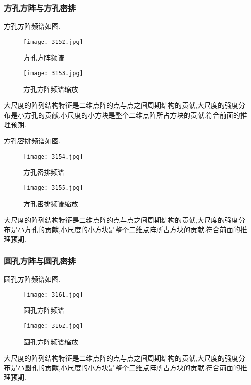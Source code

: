 \documentclass[10pt]{ctexart}
\begin{document}
\subsubsection{方孔方阵与方孔密排}
方孔方阵频谱如图.
\begin{figure}[H]
\begin{minipage}[t]{0.5\linewidth}
\centering
\texttt{[image: 3152.jpg]}
\caption{方孔方阵频谱}
\end{minipage}
\hfill
\begin{minipage}[t]{0.5\linewidth}
\centering
\texttt{[image: 3153.jpg]}
\caption{方孔方阵频谱缩放}
\end{minipage}
\end{figure}
大尺度的阵列结构特征是二维点阵的点与点之间周期结构的贡献,大尺度的强度分布是小方孔的贡献,小尺度的小方块是整个二维点阵所占方块的贡献.符合前面的推理预期.

方孔密排频谱如图.
\begin{figure}[H]
\begin{minipage}[t]{0.5\linewidth}
\centering
\texttt{[image: 3154.jpg]}
\caption{方孔密排频谱}
\end{minipage}
\hfill
\begin{minipage}[t]{0.5\linewidth}
\centering
\texttt{[image: 3155.jpg]}
\caption{方孔密排频谱缩放}
\end{minipage}
\end{figure}
大尺度的阵列结构特征是二维点阵的点与点之间周期结构的贡献,大尺度的强度分布是小方孔的贡献,小尺度的小方块是整个二维点阵所占方块的贡献.符合前面的推理预期.
\subsubsection{圆孔方阵与圆孔密排}
圆孔方阵频谱如图.
\begin{figure}[H]
\begin{minipage}[t]{0.5\linewidth}
\centering
\texttt{[image: 3161.jpg]}
\caption{圆孔方阵频谱}
\end{minipage}
\hfill
\begin{minipage}[t]{0.5\linewidth}
\centering
\texttt{[image: 3162.jpg]}
\caption{圆孔方阵频谱缩放}
\end{minipage}
\end{figure}
大尺度的阵列结构特征是二维点阵的点与点之间周期结构的贡献,大尺度的强度分布是小圆孔的贡献,小尺度的小方块是整个二维点阵所占方块的贡献.符合前面的推理预期.
\end{document}
